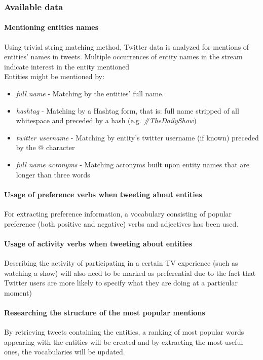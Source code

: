 \subsubsection{Available data}
\paragraph{Mentioning entities names}
Using trivial string matching method, Twitter data is analyzed for
mentions of entities' names in tweets. Multiple occurrences of entity names in the
stream indicate interest in the entity mentioned \cite{twitter-content-is-it} \\
Entities might be mentioned by:
\begin{itemize}
  \item \textit{full name} - Matching by the entities' full name.
  \item \textit{hashtag} - Matching by a Hashtag form, that is: full name stripped of all whitespace and preceded by a hash (e.g. \textit{\#TheDailyShow})
  \item \textit{twitter username} - Matching by entity's twitter username (if known) preceded by the @ character
  \item \textit{full name acronyms} - Matching acronyms built upon entity names that are longer than three words
\end{itemize}
\paragraph{Usage of preference verbs when tweeting about entities}
For extracting preference information, a vocabulary consisting of
popular preference (both positive and negative) verbs and adjectives has been used.
\paragraph{Usage of activity verbs when tweeting about entities}
Describing the activity of participating in a certain TV experience (such
as watching a show) will also need to be marked as preferential due to the
fact that Twitter users are more likely to specify what they are doing at a
particular moment)
\paragraph{Researching the structure of the most popular mentions}
By retrieving tweets containing the entities, a ranking of most popular words
appearing with the entities will be created and by extracting the most useful
ones, the vocabularies will be updated.
